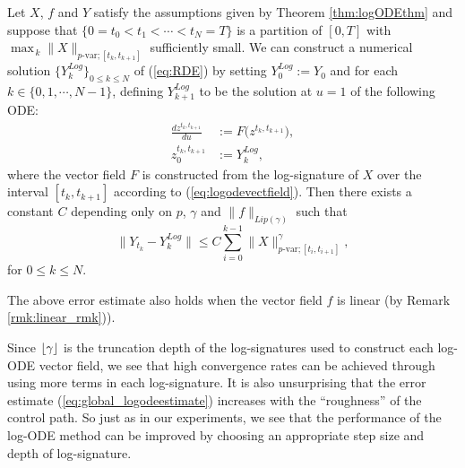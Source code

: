 \begin{theorem} Let $X$, $f$ and $Y$ satisfy the assumptions given by Theorem \ref{thm:logODEthm} and suppose that $\{0 = t_0 < t_1 < \cdots < t_N = T\}$ is a partition of $[0,T]$ with $\max_{\,k}\|X\|_{p\text{-var};[t_k,t_{k+1}]}$ sufficiently small. We can construct a numerical solution $\{Y_k^{Log}\}_{0\leq k \leq N}$ of (\ref{eq:RDE}) by setting $Y_0^{Log} := Y_0$ and for each $k \in \{0, 1, \cdots, N - 1\}$, defining $Y_{k+1}^{Log}$ to be the solution at $u=1$ of the following ODE:
\begin{align}
\frac{dz^{t_k,t_{k+1}}}{du} & := F\big(z^{t_k,t_{k+1}}\big),\label{eq:standardlogode2}\\
z_0^{t_k,t_{k+1}} & := Y_k^{Log},\nonumber
\end{align}
where the vector field $F$ is constructed from the log-signature of $X$ over the interval $[t_k, t_{k+1}]$ according to (\ref{eq:logodevectfield}). Then there exists a constant $C$ depending only on $p$, $\gamma$ and $\|f\|_{Lip(\gamma)}$ such that
\begin{equation}
\big\|Y_{t_k} - Y_k^{Log}\big\| \leq C\sum_{i=0}^{k-1}\|X\|_{p\text{-var};[t_i,t_{i+1}]}^\gamma,
\label{eq:global_logodeestimate}
\end{equation}
for $0\leq k\leq N$.
\end{theorem}
\begin{remark}
The above error estimate also holds when the vector field $f$ is linear (by Remark \ref{rmk:linear_rmk})).
\end{remark}

Since $\lfloor \gamma \rfloor$ is the truncation depth of the log-signatures used to construct each log-ODE vector field, we see that high convergence rates can be achieved through using more terms in each log-signature.
It is also unsurprising that the error estimate (\ref{eq:global_logodeestimate}) increases with the ``roughness'' of the control path.
So just as in our experiments, we see that the performance of the log-ODE method can be improved by choosing an appropriate step size and depth of log-signature.
